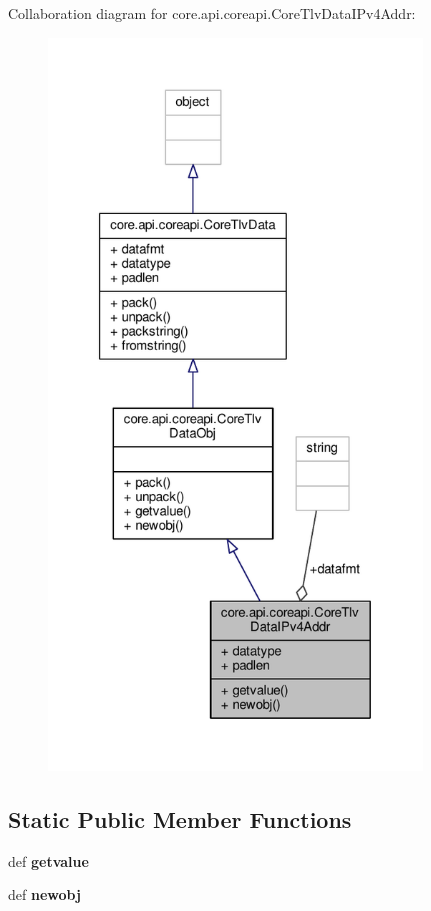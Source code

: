 Collaboration diagram for core.\+api.\+coreapi.\+Core\+Tlv\+Data\+I\+Pv4\+Addr\+:
\nopagebreak
\begin{figure}[H]
\begin{center}
\leavevmode
\includegraphics[height=550pt]{classcore_1_1api_1_1coreapi_1_1_core_tlv_data_i_pv4_addr__coll__graph}
\end{center}
\end{figure}
\subsection*{Static Public Member Functions}
\begin{DoxyCompactItemize}
\item 
\hypertarget{classcore_1_1api_1_1coreapi_1_1_core_tlv_data_i_pv4_addr_a48584a495a5c5c6ce1b3f1dc2cc6f3ab}{def {\bfseries getvalue}}\label{classcore_1_1api_1_1coreapi_1_1_core_tlv_data_i_pv4_addr_a48584a495a5c5c6ce1b3f1dc2cc6f3ab}

\item 
\hypertarget{classcore_1_1api_1_1coreapi_1_1_core_tlv_data_i_pv4_addr_aa83afe343ef60eb98993db1a7f8623a1}{def {\bfseries newobj}}\label{classcore_1_1api_1_1coreapi_1_1_core_tlv_data_i_pv4_addr_aa83afe343ef60eb98993db1a7f8623a1}

\end{DoxyCompactItemize}
